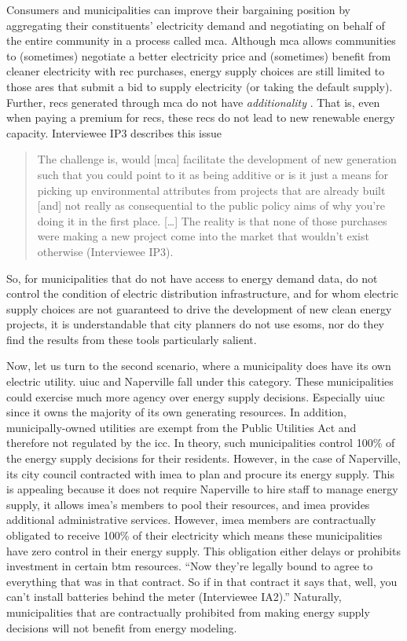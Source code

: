 Consumers and municipalities can improve their bargaining position by
aggregating their constituents' electricity demand and negotiating on behalf of
the entire community in a process called \acf{mca}. Although \ac{mca} allows
communities to (sometimes) negotiate a better electricity price and (sometimes)
benefit from cleaner electricity with \ac{rec} purchases, energy supply choices
are still limited to those \ac{ares} that submit a bid to supply electricity (or
taking the default supply). Further, \acp{rec} generated through \ac{mca} do not
have \textit{additionality} \cite{illinois_power_agency_municipal_2023}. That
is, even when paying a premium for \acp{rec}, these \acp{rec} do not lead to new
renewable energy capacity. Interviewee IP3 describes this issue
\begin{quote}
     The challenge is, would [\ac{mca}] facilitate the development of new
     generation such that you could point to it as being additive or is it just
     a means for picking up environmental attributes from projects that are
     already built [and] not really as consequential to the public policy aims
     of why you're doing it in the first place. [\dots] The reality is that none
     of those purchases were making a new project come into the market that
     wouldn't exist otherwise (Interviewee IP3).
\end{quote}

So, for municipalities that do not have access to energy demand data, do not
control the condition of electric distribution infrastructure, and for whom
electric supply choices are not guaranteed to drive the development of new clean
energy projects, it is understandable that city planners do not use \acp{esom},
nor do they find the results from these tools particularly salient. 

Now, let us turn to the second scenario, where a municipality does have its own
electric utility. \ac{uiuc} and Naperville fall under this category. These
municipalities could exercise much more agency over energy supply decisions.
Especially \ac{uiuc} since it owns the majority of its own generating resources.
In addition, municipally-owned utilities are exempt from the Public Utilities
Act and therefore not regulated by the \ac{icc}. In theory, such municipalities
control 100\% of the energy supply decisions for their residents. However, in
the case of Naperville, its city council contracted with \ac{imea} to plan and
procure its energy supply. This is appealing because it does not require
Naperville to hire staff to manage energy supply, it allows \ac{imea}'s members
to pool their resources, and \ac{imea} provides additional administrative
services. However, \ac{imea} members are contractually obligated to receive
100\% of their electricity which means these municipalities have zero control in
their energy supply. This obligation either delays or prohibits investment in
certain \ac{btm} resources. ``Now they're legally bound to agree to everything
that was in that contract. So if in that contract it says that, well, you can't
install batteries behind the meter (Interviewee IA2).'' Naturally,
municipalities that are contractually prohibited from making energy supply
decisions will not benefit from energy modeling.


